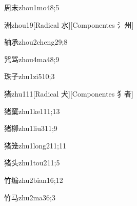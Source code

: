 \begin{verbete}{周末}{zhou1mo4}{8;5}
\end{verbete}

\begin{verbete}{洲}{zhou1}{9}[Radical 水][Componentes 氵州]
\end{verbete}

\begin{verbete}{轴承}{zhou2cheng2}{9;8}
\end{verbete}

\begin{verbete}{咒骂}{zhou4ma4}{8;9}
\end{verbete}

\begin{verbete}{珠子}{zhu1zi5}{10;3}
\end{verbete}

\begin{verbete}{猪}{zhu1}{11}[Radical 犬][Componentes 犭者]
\end{verbete}

\begin{verbete}{猪窠}{zhu1ke1}{11;13}
\end{verbete}

\begin{verbete}{猪柳}{zhu1liu3}{11;9}
\end{verbete}

\begin{verbete}{猪笼}{zhu1long2}{11;11}
\end{verbete}

\begin{verbete}{猪头}{zhu1tou2}{11;5}
\end{verbete}

\begin{verbete}{竹编}{zhu2bian1}{6;12}
\end{verbete}

\begin{verbete}{竹马}{zhu2ma3}{6;3}
\end{verbete}


